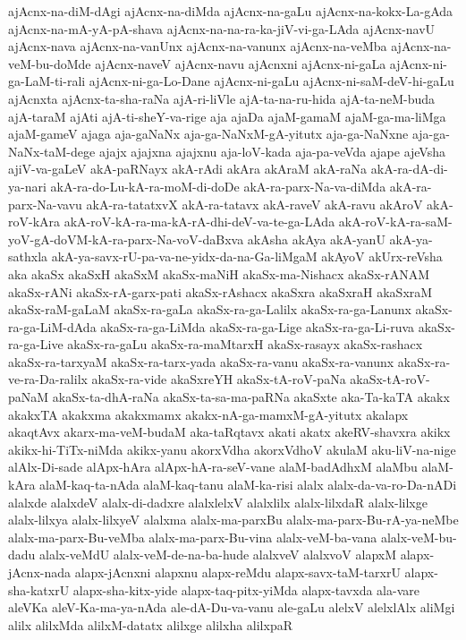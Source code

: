 {ajAcnx-na-diM-dAgi
ajAcnx-na-diMda
ajAcnx-na-gaLu
ajAcnx-na-kokx-La-gAda
ajAcnx-na-mA-yA-pA-shava
ajAcnx-na-na-ra-ka-jiV-vi-ga-LAda
ajAcnx-navU
ajAcnx-nava
ajAcnx-na-vanUnx
ajAcnx-na-vanunx
ajAcnx-na-veMba
ajAcnx-na-veM-bu-doMde
ajAcnx-naveV
ajAcnx-navu
ajAcnxni
ajAcnx-ni-gaLa
ajAcnx-ni-ga-LaM-ti-rali
ajAcnx-ni-ga-Lo-Dane
ajAcnx-ni-gaLu
ajAcnx-ni-saM-deV-hi-gaLu
ajAcnxta
ajAcnx-ta-sha-raNa
ajA-ri-liVle
ajA-ta-na-ru-hida
ajA-ta-neM-buda
ajA-taraM
ajAti
ajA-ti-sheY-va-rige
aja
ajaDa
ajaM-gamaM
ajaM-ga-ma-liMga
ajaM-gameV
ajaga
aja-gaNaNx
aja-ga-NaNxM-gA-yitutx
aja-ga-NaNxne
aja-ga-NaNx-taM-dege
ajajx
ajajxna
ajajxnu
aja-loV-kada
aja-pa-veVda
ajape
ajeVsha
ajiV-va-gaLeV
akA-paRNayx
akA-rAdi
akAra
akAraM
akA-raNa
akA-ra-dA-di-ya-nari
akA-ra-do-Lu-kA-ra-moM-di-doDe
akA-ra-parx-Na-va-diMda
akA-ra-parx-Na-vavu
akA-ra-tatatxvX
akA-ra-tatavx
akA-raveV
akA-ravu
akAroV
akA-roV-kAra
akA-roV-kA-ra-ma-kA-rA-dhi-deV-va-te-ga-LAda
akA-roV-kA-ra-saM-yoV-gA-doVM-kA-ra-parx-Na-voV-daBxva
akAsha
akAya
akA-yanU
akA-ya-sathxla
akA-ya-savx-rU-pa-va-ne-yidx-da-na-Ga-liMgaM
akAyoV
akUrx-reVsha
aka
akaSx
akaSxH
akaSxM
akaSx-maNiH
akaSx-ma-Nishacx
akaSx-rANAM
akaSx-rANi
akaSx-rA-garx-pati
akaSx-rAshacx
akaSxra
akaSxraH
akaSxraM
akaSx-raM-gaLaM
akaSx-ra-gaLa
akaSx-ra-ga-Lalilx
akaSx-ra-ga-Lanunx
akaSx-ra-ga-LiM-dAda
akaSx-ra-ga-LiMda
akaSx-ra-ga-Lige
akaSx-ra-ga-Li-ruva
akaSx-ra-ga-Live
akaSx-ra-gaLu
akaSx-ra-maMtarxH
akaSx-rasayx
akaSx-rashacx
akaSx-ra-tarxyaM
akaSx-ra-tarx-yada
akaSx-ra-vanu
akaSx-ra-vanunx
akaSx-ra-ve-ra-Da-ralilx
akaSx-ra-vide
akaSxreYH
akaSx-tA-roV-paNa
akaSx-tA-roV-paNaM
akaSx-ta-dhA-raNa
akaSx-ta-sa-ma-paRNa
akaSxte
aka-Ta-kaTA
akakx
akakxTA
akakxma
akakxmamx
akakx-nA-ga-mamxM-gA-yitutx
akalapx
akaqtAvx
akarx-ma-veM-budaM
aka-taRqtavx
akati
akatx
akeRV-shavxra
akikx
akikx-hi-TiTx-niMda
akikx-yanu
akorxVdha
akorxVdhoV
akulaM
aku-liV-na-nige
alAlx-Di-sade
alApx-hAra
alApx-hA-ra-seV-vane
alaM-badAdhxM
alaMbu
alaM-kAra
alaM-kaq-ta-nAda
alaM-kaq-tanu
alaM-ka-risi
alalx
alalx-da-va-ro-Da-nADi
alalxde
alalxdeV
alalx-di-dadxre
alalxlelxV
alalxlilx
alalx-lilxdaR
alalx-lilxge
alalx-lilxya
alalx-lilxyeV
alalxma
alalx-ma-parxBu
alalx-ma-parx-Bu-rA-ya-neMbe
alalx-ma-parx-Bu-veMba
alalx-ma-parx-Bu-vina
alalx-veM-ba-vana
alalx-veM-bu-dadu
alalx-veMdU
alalx-veM-de-na-ba-hude
alalxveV
alalxvoV
alapxM
alapx-jAcnx-nada
alapx-jAcnxni
alapxnu
alapx-reMdu
alapx-savx-taM-tarxrU
alapx-sha-katxrU
alapx-sha-kitx-yide
alapx-taq-pitx-yiMda
alapx-tavxda
ala-vare
aleVKa
aleV-Ka-ma-ya-nAda
ale-dA-Du-va-vanu
ale-gaLu
alelxV
alelxlAlx
aliMgi
alilx
alilxMda
alilxM-datatx
alilxge
alilxha
alilxpaR
}
